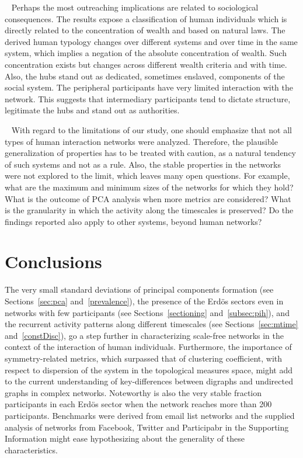 \documentclass[%
aip,
jmp,%
amsmath,amssymb,
reprint,%
]{revtex4-1}
\begin{document}
 
Perhaps the most outreaching implications are related to sociological consequences. The results expose a classification of human individuals which is directly related to the concentration of wealth and based on natural laws. The derived human typology changes over different systems and over time in the same system, which implies a negation of the absolute concentration of wealth. Such concentration exists but changes across different wealth criteria and with time. Also, the hubs stand out as dedicated, sometimes enslaved,
components of the social system. The peripheral participants have very limited interaction with the network. This suggests that intermediary participants tend to dictate structure, legitimate the hubs and stand out as authorities.

 
With regard to the limitations of our study, one should emphasize that not all types of human interaction networks were analyzed. Therefore, the plausible generalization of properties has to be treated with caution, as a natural tendency of such systems and not as a rule. Also, the stable properties in the networks were not explored to the limit, which leaves many open questions. For example, what are the maximum and minimum sizes of the networks for which they hold? What is the outcome of PCA analysis when more metrics are considered? What is the granularity in which the activity along the timescales is preserved? Do the findings reported also apply to other systems, beyond human networks?

\section{Conclusions}\label{sec:conc}
The very small standard deviations of principal components formation
(see Sections~\ref{sec:pca} and~\ref{prevalence}),
the presence of the Erd\"os sectors even in networks with
few participants (see Sections~\ref{sectioning} and~\ref{subsec:pih}),
and the recurrent activity patterns along different timescales (see Sections~\ref{sec:mtime} and~\ref{constDisc}),
go a step further in characterizing scale-free networks in the context
of the interaction of human individuals.
Furthermore, the importance of symmetry-related metrics,
which surpassed that of clustering coefficient,
with respect to dispersion of the system in the topological measures space,
might add to the current understanding of key-differences between digraphs and
undirected graphs in complex networks.
Noteworthy is also the very stable fraction participants in each Erd\"os sector when the network reaches more than 200 participants.
Benchmarks were derived from email list networks
and the supplied analysis of
networks from Facebook,
Twitter and Participabr in the Supporting Information might ease hypothesizing
about the generality of these characteristics.
\end{document}
